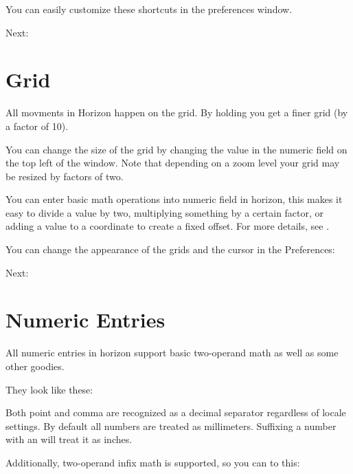 \documentclass[letterpaper,10pt,czech]{sphinxmanual}
\begin{document}
You can easily customize these shortcuts in the preferences window.

Next: {\hyperref[\detokenize{grid::doc}]{}}


\chapter{Grid}
\label{\detokenize{grid:grid}}\label{\detokenize{grid::doc}}
All movments in Horizon happen on the grid. By holding  you get a finer grid (by a factor of 10).

You can change the size of the grid by changing the value in the numeric field on the top left of the window. Note that depending on a zoom level your grid may be resized by factors of two.

\noindent{}

You can enter basic math operations into  numeric field in horizon, this makes it easy to divide a value by two, multiplying something by a certain factor, or adding a value to a coordinate to create a fixed offset. For more details, see {\hyperref[\detokenize{entries::doc}]{}}.

You can change the appearance of the grids and the cursor in the Preferences:

\noindent{}

Next: {\hyperref[\detokenize{drawing::doc}]{}}


\chapter{Numeric Entries}
\label{\detokenize{entries:numeric-entries}}\label{\detokenize{entries::doc}}
All numeric entries in horizon support basic two-operand math as well as some other goodies.

They look like these:

\noindent{}

Both point and comma are recognized as a decimal separator regardless of locale settings. By default all numbers are treated as millimeters. Suffixing a number with an  will treat it as inches.

Additionally, two-operand infix math is supported, so you can to this:
\end{document}
